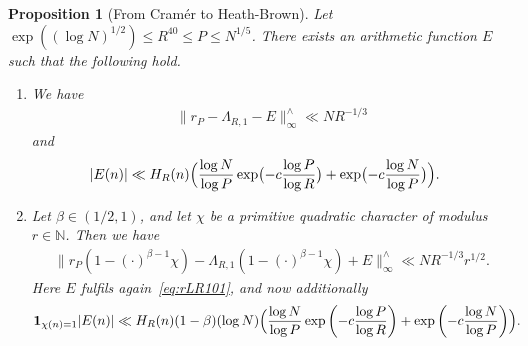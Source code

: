 \documentclass[12pt]{amsart}
\newtheorem{proposition}[theorem]{Proposition}
\theoremstyle{definition}
\theoremstyle{remark}
\numberwithin{equation}{section}
\newcommand{\1}{\mathbf{1}}
\begin{document}
\begin{proposition}[From Cram\'er to Heath-Brown]\label{prop:rLR}
    Let $\exp((\log N)^{1/2})\leq R^{40}\leq P\leq N^{1/5}$. There exists an arithmetic function $E$  such that the following hold.
    \begin{enumerate}
        \item We have
		\begin{align}\label{eq:rLR1}
		  \|r_P-\Lambda_{R,1}-E\|_{\infty}^{\wedge}\ll N R^{-1/3}
		\end{align}
	    and
	   \begin{align}
             \label{eq:rLR101} |E(n)|&\ll H_R(n) \Bigl(\frac{\log N}{\log P}\exp\bigl(-c\frac{\log P}{\log R} \bigr)+\exp\bigl({-c  \frac{\log N}{\log P}}\bigr)\Bigr).
	   \end{align}
       \item Let $\beta\in (1/2,1)$, and let $\chi$ be a primitive quadratic character of modulus $r\in \mathbb{N}$. Then we have\begin{align}\label{eq:rLRfouerror}
				\|r_P(1-(\cdot)^{\beta-1}\chi)-\Lambda_{R,1}(1-(\cdot)^{\beta-1}\chi)+E\|_{\infty}^{\wedge}\ll N R^{-1/3} r^{1/2}.
			\end{align}
             Here $E$ fulfils again~\eqref{eq:rLR101}, and now additionally
	       \begin{align}	\label{eq:rLRexcerror}
              \1_{\chi(n)=1}|E(n)|&\ll H_R(n) (1-\beta)(\log N)\Bigl(\frac{\log N}{\log P}\exp\left(-c\frac{\log P }{\log R}\right)+\exp\left(-c\frac{\log N }{\log P}\right) \Bigr).
			\end{align}
    \end{enumerate}
\end{proposition}
\end{document}
